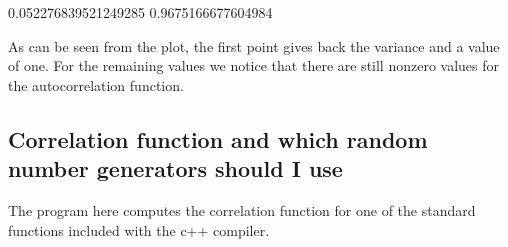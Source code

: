 \documentclass[letterpaper,10pt,english]{sphinxmanual}
\begin{document}
\begin{sphinxVerbatim}[commandchars=\\\{\}]
  
\PYG{p}{[} \PYG{p}{]}
\end{sphinxVerbatim}

\begin{sphinxVerbatim}[commandchars=\\\{\}]
0.052276839521249285 0.9675166677604984
\end{sphinxVerbatim}

\noindent{}

As can be seen from the plot, the first point gives back the variance and a value of one.
For the remaining values we notice that there are still non\sphinxhyphen{}zero values for the auto\sphinxhyphen{}correlation function.


\subsection{Correlation function and which random number generators should I use}
\label{\detokenize{chapter2:correlation-function-and-which-random-number-generators-should-i-use}}
The program here computes the correlation function for one of the standard functions included with the c++ compiler.
\end{document}
